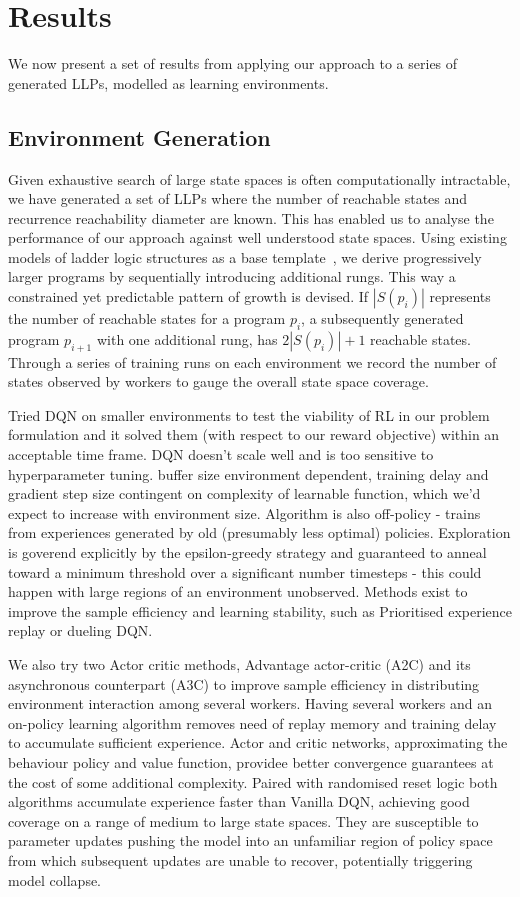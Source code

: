 \documentclass[conference,compsoc]{IEEEtran}
\begin{document}
\section{Results}
We now present a set of results from applying our approach to a series of generated LLPs, modelled as learning environments. 
\subsection{Environment Generation}

Given exhaustive search of large state spaces is often computationally intractable, we have generated a set of LLPs where the number of reachable states and recurrence reachability diameter are known. This has enabled us to analyse the performance of our approach against well understood state spaces. Using existing models of ladder logic structures as a base template~\cite{james2013verification}, we derive progressively larger programs by sequentially introducing additional rungs. This way a constrained yet predictable pattern of growth is devised. If $|S(p_i)|$ represents the number of reachable states for a program $p_i$, a subsequently generated program $p_{i+1}$ with one additional rung, has $2|S(p_i)|+1$ reachable states. Through a series of training runs on each environment we record the number of states observed by workers to gauge the overall state space coverage. 

Tried DQN on smaller environments to test the viability of RL in our problem formulation and it solved them (with respect to our reward objective) within an acceptable time frame. 
DQN doesn't scale well and is too sensitive to hyperparameter tuning. buffer size environment dependent, training delay and gradient step size contingent on complexity of learnable function, which we'd expect to increase with environment size. Algorithm is also off-policy - trains from experiences generated by old (presumably less optimal) policies. Exploration is goverend explicitly by the epsilon-greedy strategy and guaranteed to anneal toward a minimum threshold over a significant number timesteps - this could happen with large regions of an environment unobserved. Methods exist to improve the sample efficiency and learning stability, such as Prioritised experience replay or dueling DQN.

We also try two Actor critic methods, Advantage actor-critic (A2C) and its asynchronous counterpart (A3C) to improve sample efficiency in distributing environment interaction among several workers. Having several workers and an on-policy learning algorithm removes need of replay memory and training delay to accumulate sufficient experience. Actor and critic networks, approximating the behaviour policy and value function, providee better convergence guarantees at the cost of some additional complexity. Paired with randomised reset logic both algorithms accumulate experience faster than Vanilla DQN, achieving good coverage on a range of medium to large state spaces. They are susceptible to parameter updates pushing the model into an unfamiliar region of policy space from which subsequent updates are unable to recover, potentially triggering model collapse.
\end{document}
